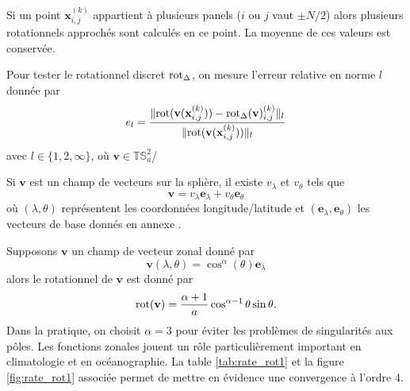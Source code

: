 Si un point $\mathbf{x}_{i,j}^{(k)}$ appartient à plusieurs panels ($i$ ou $j$ vaut $\pm N/2$) alors plusieurs rotationnels approchés sont calculés en ce point. La moyenne de ces valeurs est conservée.

Pour tester le rotationnel discret $\text{rot}_{\Delta}$, on mesure l'erreur relative en norme $l$ donnée par
\begin{equation}
e_l = \dfrac{\| \text{rot}(\mathbf{v}(\mathbf{x}_{i,j}^{(k)})) - \text{rot}_{\Delta}(\mathbf{v})_{i,j}^{(k)} \|_l}{\| \text{rot}(\mathbf{v}(\mathbf{x}_{i,j}^{(k)})) \|_l}
\end{equation}
avec $l \in \lbrace 1, 2, \infty \rbrace$, où $\mathbf{v} \in \mathbb{T}\mathbb{S}_a^2$/

Si $\mathbf{v}$ est un champ de vecteurs sur la sphère, il existe $v_{\lambda}$ et $v_{\theta}$ tels que 
\begin{equation}
\mathbf{v} = v_{\lambda} \mathbf{e}_{\lambda} + v_{\theta} \mathbf{e}_{\theta}
\end{equation} 
où $(\lambda,\theta)$ représentent les coordonnées longitude/latitude et $(\mathbf{e}_{\lambda}, \mathbf{e}_{\theta})$ les vecteurs de base donnés en annexe \REF.

Supposons $\mathbf{v}$ un champ de vecteur zonal donné par
\begin{equation}
\mathbf{v}(\lambda, \theta) = \cos^{\alpha}(\theta) \mathbf{e}_{\lambda}
\end{equation}
alors le rotationnel de $\mathbf{v}$ est donné par
\begin{equation}
\text{rot}(\mathbf{v}) = \dfrac{\alpha+1}{a} \cos^{\alpha-1} \theta \sin \theta .
\end{equation}
Dans la pratique, on choisit $\alpha = 3$ pour éviter les problèmes de singularités aux pôles. Les fonctions zonales jouent un rôle particulièrement important en climatologie et en océanographie. La table \ref{tab:rate_rot1} et la figure \ref{fig:rate_rot1} associée permet de mettre en évidence une convergence à l'ordre 4.


